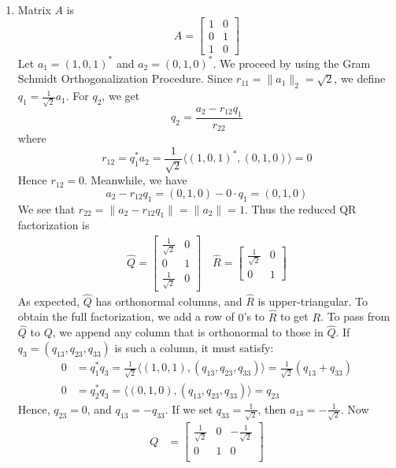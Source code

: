 \documentclass[12pt]{article}
\newenvironment{sol}[1][Solution]{\begin{trivlist}
		\item[\hskip \labelsep {\bfseries #1:}]}{\end{trivlist}}
\begin{document}
\begin{sol}
	\
	\begin{enumerate}[label=(\alph*)]
		\item Matrix $A$ is
		\[
		A=\begin{bmatrix}
			1 & 0\\
			0 & 1\\
			1 & 0
		\end{bmatrix}
		\]
		Let $a_1=(1,0,1)^*$ and $a_2=(0,1,0)^*$. We proceed by using the Gram Schmidt Orthogonalization Procedure.
		Since $r_{11}=\lVert a_1\rVert_2 = \sqrt{2}$, we define $q_1=\frac{1}{\sqrt{2}}a_1$. For $q_2$, we get
		\[
		q_2=\frac{a_2-r_{12}q_1}{r_{22}}
		\]
		where
		\[
		r_{12}=q_1^*a_2=\frac{1}{\sqrt{2}}\langle (1,0,1)^*, (0,1,0)\rangle=0
		\]
		Hence $r_{12}=0$. Meanwhile, we have
		\[
		a_{2}-r_{12}q_1=(0,1,0)-0\cdot q_1=(0,1,0)
		\]
		We see that $r_{22}=\lVert a_2-r_{12}q_1\rVert=\lVert a_2\rVert=1$. Thus the reduced QR factorization is
		\begin{align*}
			\hat{Q}=\begin{bmatrix}
				\frac{1}{\sqrt{2}} & 0\\
				0 & 1\\
				\frac{1}{\sqrt{2}} & 0
			\end{bmatrix}
			\quad
			\hat{R}=\begin{bmatrix}
				\frac{1}{\sqrt{2}} & 0\\
				0 & 1
			\end{bmatrix}
		\end{align*}
		As expected, $\hat{Q}$ has orthonormal columns, and $\hat{R}$ is upper-triangular. To obtain the full
		factorization, we add a row of $0$'s to $\hat{R}$ to get $R$. To pass from $\hat{Q}$ to $Q$, we append
		any column that is orthonormal to those in $\hat{Q}$. If $q_3=(q_{13},q_{23},q_{33})$ is such a column,
		it must satisfy:
		\begin{align*}
		0&=q_1^*q_3=\frac{1}{\sqrt{2}}\langle (1,0,1), (q_{13},q_{23},q_{33})\rangle=\frac{1}{\sqrt{2}}(q_{13}+q_{33})\\
		0&=q_2^*q_3=\langle (0,1,0), (q_{13},q_{23},q_{33})\rangle=q_{23}
		\end{align*}
		Hence, $q_{23}=0$, and $q_{13}=-q_{33}$. If we set $q_{33}=\frac{1}{\sqrt{2}}$, then $a_{13}=-\frac{1}{\sqrt{2}}$.
		Now
		\begin{align*}
			Q&=\begin{bmatrix}
				\frac{1}{\sqrt{2}} & 0 & -\frac{1}{\sqrt{2}}\\
				0 & 1 & 0\\

\end{bmatrix}
\end{align*}
\end{enumerate}
\end{sol}
\end{document}
